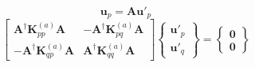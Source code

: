 \documentclass[11pt]{article} %
\begin{document}
\begin{equation}
	\mathbf{u}_p = \mathbf{A} \mathbf{u}'_p
\end{equation}
\begin{equation}
	\left[ \begin{array}{cc} \mathbf{A}^{\dagger} \mathbf{K}_{pp}^{(a)} \mathbf{A} & - \mathbf{A}^{\dagger} \mathbf{K}_{pq}^{(a)} \mathbf{A} \\ - \mathbf{A}^{\dagger} \mathbf{K}_{qp}^{(a)} \mathbf{A} & \mathbf{A}^{\dagger} \mathbf{K}_{qq}^{(a)} \mathbf{A} \end{array} \right] \left\{ \begin{array}{c} \mathbf{u}'_p \\ \mathbf{u}'_q \end{array} \right\} = \left\{ \begin{array}{c} \mathbf{0} \\ \mathbf{0} \end{array} \right\}
\end{equation}
\end{document}
